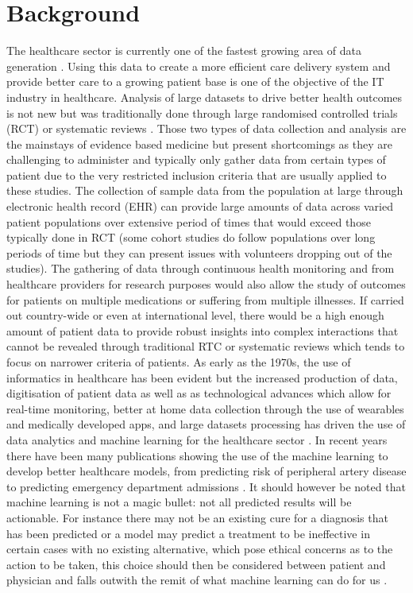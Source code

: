 \section{Background}
The healthcare sector is currently one of the fastest growing area of data generation \citep{EMC:2014ve}. Using this data to create a more efficient care delivery system and provide better care to a growing patient base is one of the objective of the IT industry in healthcare. Analysis of large datasets to drive better health outcomes is not new but was traditionally done through large randomised controlled trials (RCT) or systematic reviews \citep{Callahan:2017bz}. Those two types of data collection and analysis are the mainstays of evidence based medicine but present shortcomings as they are challenging to administer and typically only gather data from certain types of patient due to the very restricted inclusion criteria that are usually applied to these studies.\newline
The collection of sample data from the population at large through electronic health record (EHR) can provide large amounts of data across varied patient populations over extensive period of times that would exceed those typically done in RCT (some cohort studies do follow populations over long periods of time but they can present issues with volunteers dropping out of the studies). The gathering of data through continuous health monitoring and from healthcare providers for research purposes would also allow the study of outcomes for patients on multiple medications or suffering from multiple illnesses. If carried out country-wide or even at international level, there would be a high enough amount of patient data to provide robust insights into complex interactions that cannot be revealed through traditional RTC or systematic reviews which tends to focus on narrower criteria of patients.\newline
As early as the 1970s, the use of informatics in healthcare has been evident but the increased production of data, digitisation of patient data as well as as technological advances which allow for real-time monitoring, better at home data collection through the use of wearables and medically developed apps, and large datasets processing has driven the use of  data analytics and machine learning for the healthcare sector \citep{EMC:2014ve}.\newline
In recent years there have been many publications showing the use of the machine learning to develop better healthcare models, from predicting risk of peripheral artery disease \citep{Ross:2016kh} to predicting emergency department admissions \citep{Peck:2012eg}.\newline
It should however be noted that machine learning is not a magic bullet: not all predicted results will be actionable. For instance there may not be an existing cure for a diagnosis that has been predicted or a model may predict a treatment to be ineffective in certain cases with no existing alternative, which pose ethical concerns as to the action to be taken, this choice should then be considered between patient and physician and falls outwith the remit of what machine learning can do for us \citep{Callahan:2017bz}.\newline

